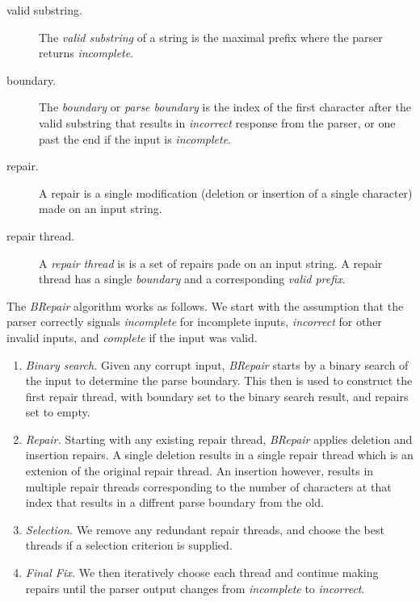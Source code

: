 \documentclass[sigconf,review,anonymous]{acmart}
\newcounter{todocounter}
\newcommand{\todo}[1]{\marginpar{$|$}\textcolor{red}{\stepcounter{todocounter}\footnote[\thetodocounter]{\textcolor{red}{\textbf{TODO }}\textit{#1}}}}
\renewcommand{\todo}[1]{}
\newcommand{\brepair}{\textit{BRepair}\xspace}
\begin{document}
\begin{description}
\item[valid substring.] The \emph{valid substring} of a string is the maximal prefix where the parser returns
\emph{incomplete}.
\item[boundary.] The \emph{boundary} or \emph{parse boundary} is the index of
the first character after the valid substring that results in
\emph{incorrect} response from the parser, or one past the end if the input is
\emph{incomplete}.
\item[repair.] A repair is a single modification (deletion or insertion of a
single character) made on an input string.
\item[repair thread.] A \emph{repair thread} is is a set of repairs pade on an
input string. A repair thread has a single \emph{boundary} and a corresponding
\emph{valid prefix}.
\end{description}


The \brepair algorithm works as follows.
We start with the assumption that the parser correctly signals
\emph{incomplete} for incomplete inputs, \emph{incorrect} for other invalid
inputs, and \emph{complete} if the input was valid.\todo{we need to sync these steps with the workflow diagram (\autoref{fig:brepair_flowchart}), and also name/number steps 1,2, ...}

\begin{enumerate}[wide, labelwidth=!, labelindent=0pt]
\item \emph{Binary search.} Given any corrupt input, \brepair starts by a
binary search of the input to determine the parse boundary. This then is used
to construct the first repair thread, with boundary set to the binary search
result, and repairs set to empty.

\item \emph{Repair.} Starting with any existing repair thread, \brepair applies
deletion and insertion repairs. A single deletion results in a single repair
thread which is an extenion of the original repair thread.
An insertion however, results in multiple repair threads corresponding to the
number of characters at that index that results in a diffrent parse boundary from
the old.

\item \emph{Selection.} We remove any redundant repair threads, and choose the best threads if a
selection criterion is supplied.

\item \emph{Final Fix.} We then iteratively choose each thread and continue making repairs
until the parser output changes from \emph{incomplete} to \emph{incorrect}.
\end{enumerate}
\end{document}

